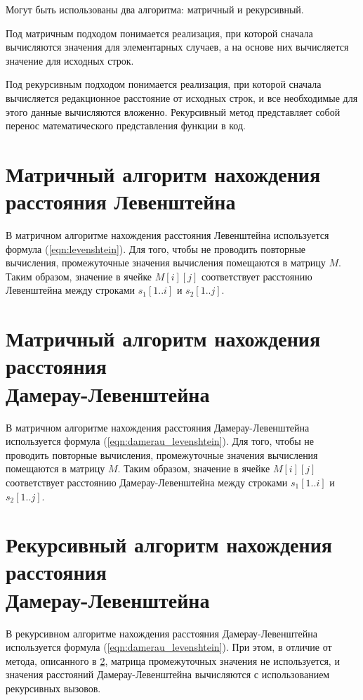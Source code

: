 Могут быть использованы два алгоритма: матричный и рекурсивный.

Под матричным подходом понимается реализация, при которой сначала вычисляются значения для элементарных случаев, а на основе них вычисляется значение для исходных строк. 

Под рекурсивным подходом понимается реализация, при которой сначала вычисляется редакционное расстояние от исходных строк, и все необходимые для этого данные вычисляются вложенно. Рекурсивный метод представляет собой перенос математического представления функции в код.

\section{Матричный алгоритм нахождения расстояния Левенштейна}
\label{section:levenshtein_matrix}
В матричном алгоритме нахождения расстояния Левенштейна используется формула (\ref{eqn:levenshtein}). Для того, чтобы не проводить повторные вычисления, промежуточные значения вычисления помещаются в матрицу $M$. Таким образом, значение в ячейке $M[i][j]$ соответствует расстоянию Левенштейна между строками $s_1[1..i]$ и $s_2[1..j]$.

\section{Матричный алгоритм нахождения расстояния \\Дамерау-Левенштейна}
\label{section:damerau_levenshtein_matrix}
В матричном алгоритме нахождения расстояния Дамерау-Левенштейна используется формула (\ref{eqn:damerau_levenshtein}). Для того, чтобы не проводить повторные вычисления, промежуточные значения вычисления помещаются в матрицу $M$. Таким образом, значение в ячейке $M[i][j]$ соответствует расстоянию Дамерау-Левенштейна между строками $s_1[1..i]$ и $s_2[1..j]$.

\section{Рекурсивный алгоритм нахождения расстояния \\Дамерау-Левенштейна}
\label{section:damerau_levenshtein_recursive}
В рекурсивном алгоритме нахождения расстояния Дамерау-Левенштейна используется формула (\ref{eqn:damerau_levenshtein}). При этом, в отличие от метода, описанного в \ref{section:damerau_levenshtein_matrix}, матрица промежуточных значения не используется, и значения расстояний Дамерау-Левенштейна вычисляются с использованием рекурсивных вызовов. 


